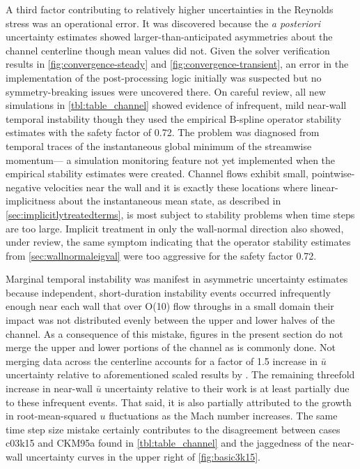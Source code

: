 A third factor contributing to relatively higher uncertainties in the Reynolds
stress was an operational error.  It was discovered because the \emph{a
posteriori} uncertainty estimates showed larger-than-anticipated asymmetries
about the channel centerline though mean values did not.
%
Given the solver verification results in \autoref{fig:convergence-steady} and
\autoref{fig:convergence-transient}, an error in the implementation of the
post-processing logic initially was suspected but no symmetry-breaking issues
were uncovered there.
%
On careful review, all new simulations in \autoref{tbl:table_channel} showed
evidence of infrequent, mild near-wall temporal instability though they used
the empirical B-spline operator stability estimates
with the safety factor
of 0.72.
%
The problem was diagnosed from temporal traces of the instantaneous global
minimum of the streamwise momentum--- a simulation monitoring feature not yet
implemented when the empirical stability estimates were created.  Channel flows
exhibit small, pointwise-negative velocities near the wall and it is exactly
these locations where linear-implicitness about the instantaneous mean state,
as described in \autoref{sec:implicitlytreatedterms}, is most subject to
stability problems when time steps are too large.
%
Implicit treatment in only the wall-normal direction also showed, under review,
the same symptom indicating that the operator stability estimates from
\autoref{sec:wallnormaleigval} were too aggressive for the safety factor
0.72.

Marginal temporal instability was manifest in asymmetric uncertainty estimates
because independent, short-duration instability events occurred infrequently
enough near each wall that over O(10) flow throughs in a small domain their
impact was not distributed evenly between the upper and lower halves of the
channel.
%
As a consequence of this mistake, figures in the present section do not merge
the upper and lower portions of the channel as is commonly done.  Not merging
data across the centerline accounts for a factor of 1.5 increase in $\bar{u}$
uncertainty relative to aforementioned scaled results by
\citet{Oliver2014Estimating}.
%
The remaining threefold increase in near-wall $\bar{u}$ uncertainty relative to
their work is at least partially due to these infrequent events.  That said,
it is also partially attributed to the growth in root-mean-squared $u$
fluctuations as the Mach number increases.
%
The same time step size mistake certainly contributes to the disagreement
between cases c03k15 and CKM95a found in \autoref{tbl:table_channel} and the
jaggedness of the near-wall uncertainty curves in the upper right of
\autoref{fig:basic3k15}.

